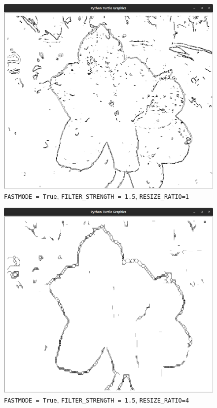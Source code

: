 \documentclass{article}
\begin{document}
\begin{figure}[H]
\centering
\includegraphics[width=\textwidth]{./simple1.png}
\caption{
\texttt{FASTMODE\ =\ True}, \texttt{FILTER\_STRENGTH\ =\ 1.5},
\texttt{RESIZE\_RATIO=1}
}
\end{figure} 

\begin{figure}[H]
\centering
\includegraphics[width=\textwidth]{./simple4.png}
\caption{
\texttt{FASTMODE\ =\ True}, \texttt{FILTER\_STRENGTH\ =\ 1.5},
\texttt{RESIZE\_RATIO=4}
}
\end{figure} 
\end{document}
